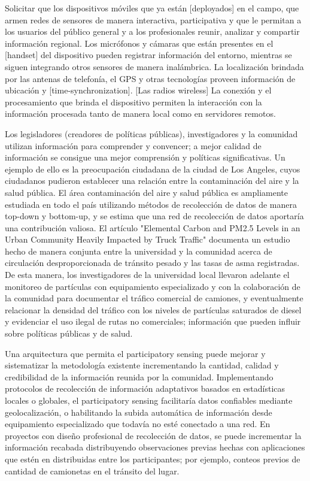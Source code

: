 	Solicitar que los dispositivos móviles que ya están [deployados] en el campo, que armen redes de sensores de manera interactiva, participativa y que le permitan a los usuarios del público general y a los profesionales reunir, analizar y compartir información regional. Los micrófonos y cámaras que están presentes en el [handset] del dispositivo pueden registrar información del entorno, mientras se siguen integrando otros sensores de manera inalámbrica. La localización brindada por las antenas de telefonía, el GPS y otras tecnologías proveen información de ubicación y [time-synchronization]. [Las radios wireless] La conexión y el procesamiento que brinda el dispositivo permiten la interacción con la información procesada tanto de manera local como en servidores remotos. 
	
	Los legisladores (creadores de políticas públicas), investigadores y la comunidad utilizan información para comprender y convencer; a mejor calidad de información se consigue una mejor comprensión y políticas significativas. Un ejemplo de ello es la preocupación ciudadana de la ciudad de Los Angeles, cuyos ciudadanos pudieron establecer una relación entre la contaminación del aire y la salud pública. El área contaminación del aire y salud pública es ampliamente estudiada en todo el país utilizando métodos de recolección de datos de manera top-down y bottom-up, y se estima que una red de recolección de datos aportaría una contribución valiosa. El artículo "Elemental Carbon and PM2.5 Levels in an Urban Community Heavily Impacted by Truck Traffic" documenta un estudio hecho de manera conjunta entre la universidad y la comunidad acerca de circulación desproporcionada de tránsito pesado y las tasas de asma registradas. De esta manera, los investigadores de la universidad local llevaron adelante el monitoreo de partículas con equipamiento especializado y con la colaboración de la comunidad para documentar el tráfico comercial de camiones, y eventualmente relacionar la densidad del tráfico con los niveles de partículas saturados de diesel y evidenciar el uso ilegal de rutas no comerciales; información que pueden influir sobre políticas públicas y de salud.
	
	Una arquitectura que permita el participatory sensing puede mejorar y sistematizar la metodología existente incrementando la cantidad, calidad y credibilidad de la información reunida por la comunidad. Implementando protocolos de recolección de información adaptativos basados en estadísticas locales o globales, el participatory sensing facilitaría datos confiables mediante geolocalización, o habilitando la subida automática de información desde equipamiento especializado que todavía no esté conectado a una red. En proyectos con diseño profesional de recolección de datos, se puede incrementar la información recabada distribuyendo observaciones previas hechas con aplicaciones que estén en distribuidas entre los participantes; por ejemplo, conteos previos de cantidad de camionetas en el tránsito del lugar.
	
